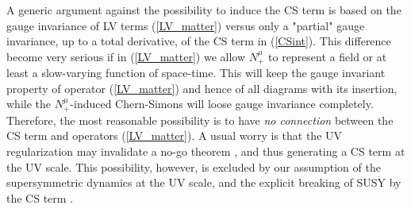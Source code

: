 \documentclass[12pt]{revtex4}
\begin{document}
A generic argument against the possibility to induce the CS term
    is based on the gauge invariance of  LV terms (\ref{LV_matter})
versus only  a "partial" gauge invariance, up to a total derivative, of the 
    CS term in (\ref{CSint}).
This difference become very serious if in (\ref{LV_matter})
we allow $ N_+^\mu $ to represent a field or at least a slow-varying function
of space-time.  This will keep the gauge invariant property of 
    operator (\ref{LV_matter}) and hence of all diagrams with its insertion,
while the $ N_+^\mu $-induced Chern-Simons will loose gauge invariance completely.
Therefore, the most reasonable possibility is to have {\em no connection} between 
the CS term and operators  (\ref{LV_matter}). A usual worry is that 
the UV regularization may invalidate a no-go theorem \cite{CG}, and thus generating 
    a CS term at the UV scale. This possibility, however, 
is excluded by our assumption of the supersymmetric dynamics at the UV scale, and the 
explicit breaking of SUSY by the CS term \cite{Belich:,GrootNibbelink:2004za}.
\end{document}
